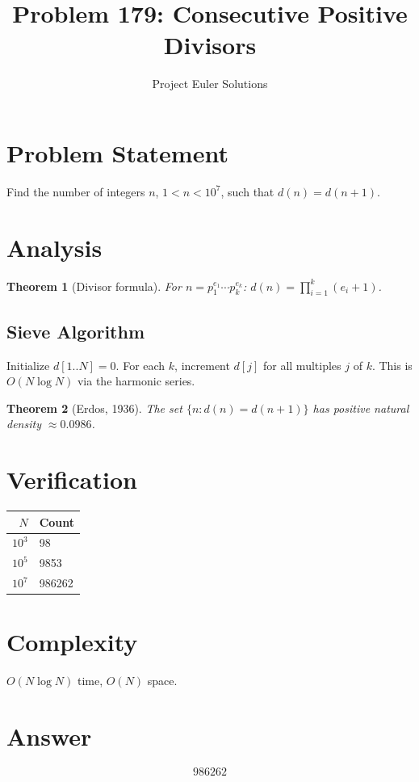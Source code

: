 \documentclass[11pt]{article}
\title{Problem 179: Consecutive Positive Divisors}
\author{Project Euler Solutions}
\date{}
\newtheorem{theorem}{Theorem}
\begin{document}
\maketitle

\section{Problem Statement}
Find the number of integers $n$, $1 < n < 10^7$, such that $d(n) = d(n+1)$.

\section{Analysis}
\begin{theorem}[Divisor formula]
For $n = p_1^{e_1} \cdots p_k^{e_k}$: $d(n) = \prod_{i=1}^{k}(e_i + 1)$.
\end{theorem}

\subsection{Sieve Algorithm}
Initialize $d[1..N] = 0$. For each $k$, increment $d[j]$ for all multiples $j$ of $k$. This is $O(N \log N)$ via the harmonic series.

\begin{theorem}[Erdos, 1936]
The set $\{n : d(n) = d(n+1)\}$ has positive natural density $\approx 0.0986$.
\end{theorem}

\section{Verification}
\begin{center}
\begin{tabular}{rl}
\toprule
$N$ & Count \\
\midrule
$10^3$ & 98 \\
$10^5$ & 9853 \\
$10^7$ & 986262 \\
\bottomrule
\end{tabular}
\end{center}

\section{Complexity}
$O(N \log N)$ time, $O(N)$ space.

\section{Answer}

\[
\boxed{986262}
\]
\end{document}
